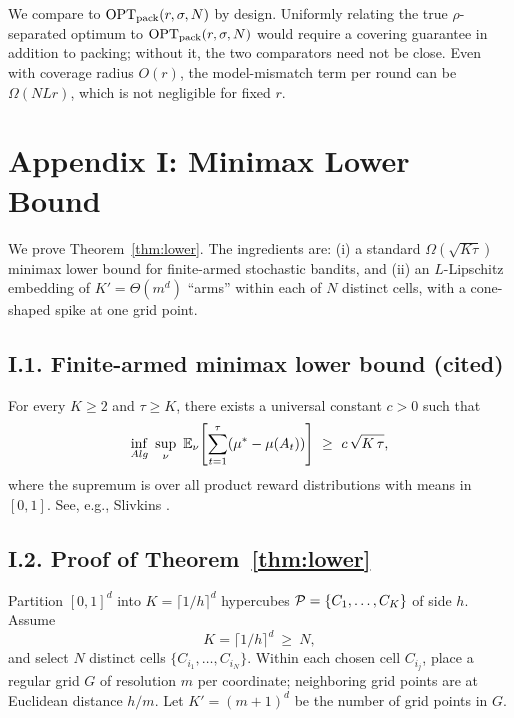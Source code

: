 \begin{remark}
\label{rem:pack-vs-true}
We compare to $\mathrm{OPT}_{\mathrm{pack}}(r,\sigma,N)$ by design. Uniformly relating the true $\rho$-separated optimum to $\mathrm{OPT}_{\mathrm{pack}}(r,\sigma,N)$ would require a  {covering} guarantee in addition to packing; without it, the two comparators need not be close. Even with coverage radius $O(r)$, the model-mismatch term per round can be $\Omega(NL r)$, which is not negligible for fixed $r$.
\end{remark}










\section*{Appendix I: Minimax Lower Bound}
\label{app:lower}

We prove Theorem~\ref{thm:lower}. The ingredients are: (i) a standard $\Omega(\sqrt{K\tau})$ minimax lower bound for  {finite-armed} stochastic bandits, and (ii) an $L$-Lipschitz embedding of $K'=\Theta(m^d)$ ``arms” within each of $N$ distinct cells, with a cone-shaped spike at one grid point.

\subsection*{I.1.\; Finite-armed minimax lower bound (cited)}
For every $K\ge 2$ and $\tau\ge K$, there exists a universal constant $c>0$ such that
\begin{equation}
\label{eq:finite-lb}
\inf_{Alg}\ \sup_{\nu}\ \mathbb{E}_{\nu}\!\left[\sum_{t=1}^{\tau} (\mu^\ast-\mu(A_t))\right]\ \ge\ c\,\sqrt{K\,\tau},
\end{equation}
where the supremum is over all product reward distributions with means in $[0,1]$. See, e.g., Slivkins \citep{slivkins2019introduction}.

\subsection*{I.2.\; Proof of Theorem~\ref{thm:lower}}

Partition $[0,1]^d$ into $K=\lceil 1/h\rceil^d$ hypercubes $\mathcal{P}=\{C_1,\dots,C_K\}$ of side $h$. Assume
\[
K=\lceil 1/h\rceil^d\ \ge\ N,
\]
and select $N$ distinct cells $\{C_{i_1},\dots,C_{i_N}\}$. Within each chosen cell $C_{i_j}$, place a regular grid $G$ of resolution $m$ per coordinate; neighboring grid points are at Euclidean distance $h/m$. Let $K'=(m+1)^d$ be the number of grid points in $G$.


